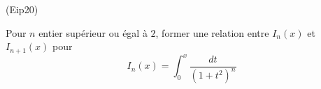 \begin{tiny}(Eip20)\end{tiny}
Pour $n$ entier supérieur ou égal à $2$, former une relation entre $I_n(x)$ et $I_{n+1}(x)$ pour
\begin{displaymath}
 I_n(x) = \int_0^x\frac{dt}{(1+ t^2)^n}
\end{displaymath}
